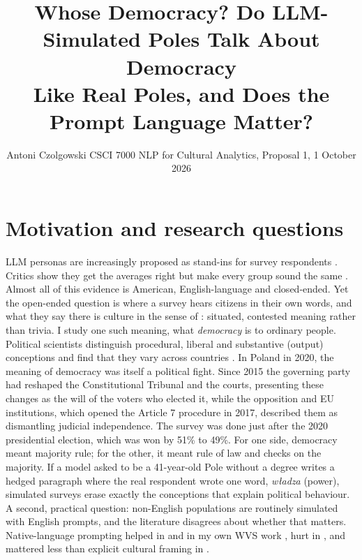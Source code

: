 \documentclass[10pt,twocolumn]{article}
\title{\vspace{-0.62in}\large\textbf{Whose Democracy? Do LLM-Simulated Poles Talk About Democracy\\Like Real Poles, and Does the Prompt Language Matter?}}
\author{\normalsize Antoni Czolgowski \quad CSCI 7000 NLP for Cultural Analytics, Proposal 1, 1 October 2026}
\date{\vspace{-0.32in}}
\begin{document}
\maketitle

\section{Motivation and research questions}
LLM personas are increasingly proposed as stand-ins for survey respondents \citep{argyle2023,park2024}. Critics show they get the averages right but make every group sound the same \citep{bisbee2024,wang2025}. Almost all of this evidence is American, English-language and closed-ended. Yet the open-ended question is where a survey hears citizens in their own words, and what they say there is culture in the sense of \citet{zhou2025}: situated, contested meaning rather than trivia. I study one such meaning, what \emph{democracy} is to ordinary people. Political scientists distinguish procedural, liberal and substantive (output) conceptions and find that they vary across countries \citep{dalton2007,ferrin2016}. In Poland in 2020, the meaning of democracy was itself a political fight. Since 2015 the governing party had reshaped the Constitutional Tribunal and the courts, presenting these changes as the will of the voters who elected it, while the opposition and EU institutions, which opened the Article 7 procedure in 2017, described them as dismantling judicial independence. The survey was done just after the 2020 presidential election, which was won by 51\% to 49\%. For one side, democracy meant majority rule; for the other, it meant rule of law and checks on the majority. If a model asked to be a 41-year-old Pole without a degree writes a hedged paragraph where the real respondent wrote one word, \emph{władza} (power), simulated surveys erase exactly the conceptions that explain political behaviour. A second, practical question: non-English populations are routinely simulated with English prompts, and the literature disagrees about whether that matters. Native-language prompting helped in \citet{alkhamissi2024} and in my own WVS work \citep{czolgowski2026}, hurt in \citet{kwok2024}, and mattered less than explicit cultural framing in \citet{bulte2026}.
\end{document}
